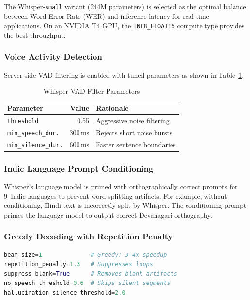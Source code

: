 \documentclass[conference]{IEEEtran}
\begin{document}
The Whisper-\texttt{small} variant (244M parameters) is selected as the optimal balance between Word Error Rate (WER) and inference latency for real-time applications. On an NVIDIA T4 GPU, the \texttt{INT8\_FLOAT16} compute type provides the best throughput.

\subsubsection{Voice Activity Detection}

Server-side VAD filtering is enabled with tuned parameters as shown in Table~\ref{tab:vad}.

\begin{table}[htbp]
\centering
\caption{Whisper VAD Filter Parameters}
\label{tab:vad}
\begin{tabular}{lrl}
\toprule
\textbf{Parameter} & \textbf{Value} & \textbf{Rationale} \\
\midrule
\texttt{threshold} & 0.55 & Aggressive noise filtering \\
\texttt{min\_speech\_dur.} & 300\,ms & Rejects short noise bursts \\
\texttt{min\_silence\_dur.} & 600\,ms & Faster sentence boundaries \\
\bottomrule
\end{tabular}
\end{table}

\subsubsection{Indic Language Prompt Conditioning}

Whisper's language model is primed with orthographically correct prompts for 9~Indic languages to prevent word-splitting artifacts. For example, without conditioning, Hindi text is incorrectly split by Whisper. The conditioning prompt primes the language model to output correct Devanagari orthography.

\subsubsection{Greedy Decoding with Repetition Penalty}

\begin{lstlisting}[language=Python, caption={Whisper transcription parameters}]
beam_size=1              # Greedy: 3-4x speedup
repetition_penalty=1.3   # Suppresses loops
suppress_blank=True      # Removes blank artifacts
no_speech_threshold=0.6  # Skips silent segments
hallucination_silence_threshold=2.0
\end{lstlisting}
\end{document}
